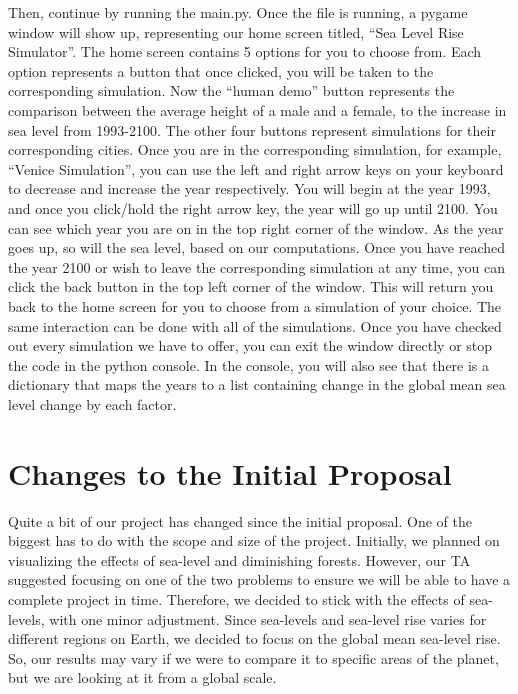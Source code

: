 \documentclass[fontsize=11pt]{article}
\begin{document}
Then, continue by running the main.py. Once the file is running, a pygame window will show up, representing our home screen titled, “Sea Level Rise Simulator”. The home screen contains 5 options for you to choose from. Each option represents a button that once clicked, you will be taken to the corresponding simulation. Now the “human demo” button represents the comparison between the average height of a male and a female, to the increase in sea level from 1993-2100.
The other four buttons represent simulations for their corresponding cities. Once you are in the corresponding simulation, for example, “Venice Simulation”, you can use the left and right arrow keys on your keyboard to decrease and increase the year respectively. You will begin at the year 1993, and once you click/hold the right arrow key, the year will go up until 2100. You can see which year you are on in the top right corner of the window. As the year goes up, so will the sea level, based on our computations. Once you have reached the year 2100 or wish to leave the corresponding simulation at any time, you can click the back button in the top left corner of the window. This will return you back to the home screen for you to choose from a simulation of your choice. The same interaction can be done with all of the simulations. Once you have checked out every simulation we have to offer, you can exit the window directly or stop the code in the python console. In the console, you will also see that there is a dictionary that maps the years to a list containing change in the global mean sea level change by each factor.

\newpage
\section*{Changes to the Initial Proposal}

Quite a bit of our project has changed since the initial proposal. One of the biggest has to do with the scope and size of the project. Initially, we planned on visualizing the effects of sea-level and diminishing forests. However, our TA suggested focusing on one of the two problems to ensure we will be able to have a complete project in time. Therefore, we decided to stick with the effects of sea-levels, with one minor adjustment. Since sea-levels and sea-level rise varies for different regions on Earth, we decided to focus on the global mean sea-level rise. So, our results may vary if we were to compare it to specific areas of the planet, but we are looking at it from a global scale.\\
\end{document}
